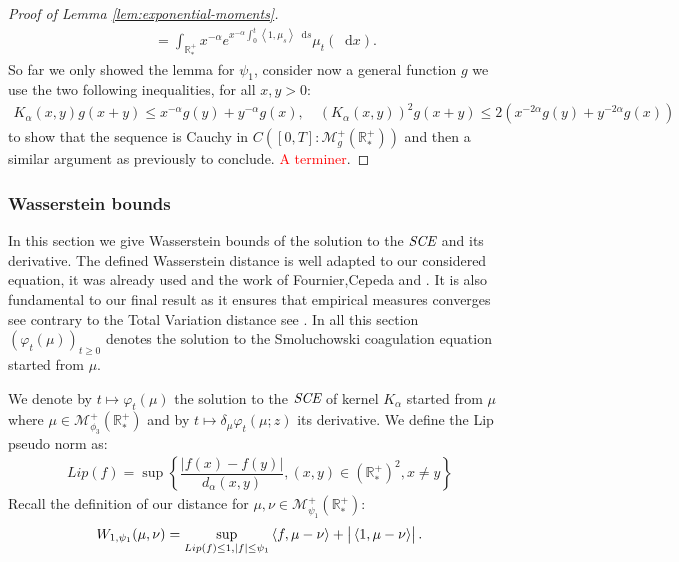 \documentclass[11pt,a4paper]{article}
\newcommand{\RR}{\mathbb{R}}
\newcommand{\RRP}{\mathbb{R}^+_*}
\newcommand{\MC}{\mathcal{M}}
\newcommand{\SCE}{\emph{SCE}}
\newcommand{\red}[1]{\textcolor{red}{#1}}
\newcommand{\Proc}[1]{\left(#1\right)_{t\geq 0}}
\newcommand{\brac}[1]{\left\langle#1\right\rangle}
\newcommand{\dd}{\mathop{}\!\mathrm{d}}
\begin{document}
\begin{proof}[Proof of Lemma \ref{lem:exponential-moments}]
\begin{align*}
        & = \int_{\RRP}x^{-\alpha}e^{x^{-\alpha}\int_0^t \brac{1,\mu_s} \dd s} \mu_t(\dd x).
    \end{align*}
    So far we only showed the lemma for $\psi_1$, consider now a general function $g$ we use the two following inequalities, for all $x,y > 0$:
    \begin{align*}
        K_\alpha(x,y) g(x+y) \leq x^{-\alpha} g(y) + y^{-\alpha}g(x), \quad  (K_\alpha(x,y))^2 g(x+y) \leq 2(x^{-2\alpha} g(y) + y^{-2\alpha}g(x))
    \end{align*}
    to show that the sequence is Cauchy in $C\left([0,T]:\MC^+_{g}(\RRP)\right)$ and then a similar argument as previously to conclude.
    \red{A terminer}.
\end{proof}

\subsubsection{Wasserstein bounds}

In this section we give Wasserstein bounds of the solution to the $\SCE$ and its derivative. The defined Wasserstein distance is well adapted to our considered equation, it was already used and the work of Fournier,Cepeda \cite{cepedaSmoluchowskisEquationRate2011a} and \cite{fournier2004convergence,fournierDistanceCoagulation2006}. It is also fundamental to our final result as it ensures that empirical measures converges see \cite{fournier2015rate} contrary to the Total Variation distance see \cite{devroye1990no}. In all this section $\Proc{\varphi_t(\mu)}$ denotes the solution to the Smoluchowski coagulation equation started from $\mu$. 

We denote by $t \mapsto \varphi_t(\mu)$ the solution to the $\SCE$ of kernel $K_\alpha$ started from $\mu$ where $\mu \in \MC_{\phi_3}^+(\RRP)$ and by $t \mapsto \delta_\mu\varphi_t(\mu;z)$ its derivative. We define the Lip pseudo norm as:
\begin{align*}
    Lip(f) = \sup\left\lbrace \dfrac{|f(x) - f(y)|}{d_\alpha(x,y)} , (x ,y) \in \left(\RR ^+_*\right)^2,x\neq y \right\rbrace 
\end{align*}
Recall the definition of our distance for $\mu,\nu \in \MC_{\psi_1}^+(\RRP)$:
\begin{align*}
    W_{1,\psi_1}(\mu,\nu) = \sup\limits_{Lip(f) \leq 1, |f| \leq \psi_1} \brac{f,\mu - \nu} + \left|\vphantom{A^2} \brac{1,\mu - \nu} \right|.
\end{align*}
\end{document}
